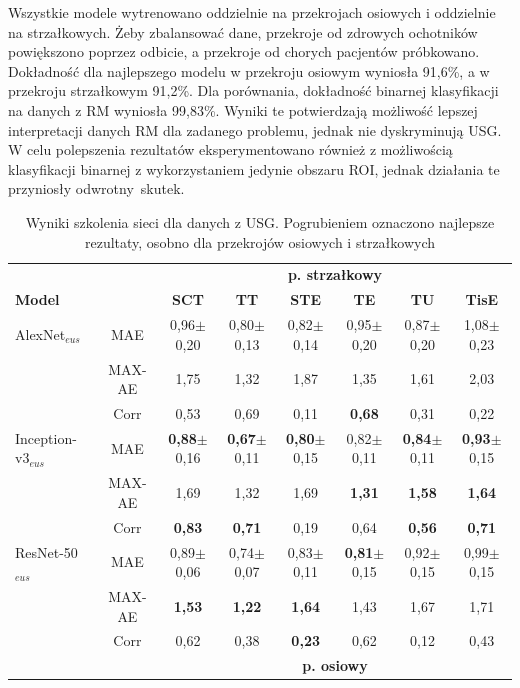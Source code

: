 Wszystkie modele wytrenowano oddzielnie na przekrojach osiowych i oddzielnie na strzałkowych. Żeby zbalansować dane, przekroje od zdrowych ochotników powiększono poprzez odbicie, a przekroje od chorych pacjentów próbkowano. Dokładność dla najlepszego modelu w przekroju osiowym wyniosła 91,6\%, a w przekroju strzałkowym 91,2\%. Dla porównania, dokładność binarnej klasyfikacji na danych z RM wyniosła 99,83\%. Wyniki te potwierdzają możliwość lepszej interpretacji danych RM dla zadanego problemu, jednak nie dyskryminują USG. W celu polepszenia rezultatów eksperymentowano również z możliwością klasyfikacji binarnej z wykorzystaniem jedynie obszaru ROI, jednak działania te przyniosły odwrotny~skutek.  
\vspace{6px}
\renewcommand{\arraystretch}{1.2}
\begin{table}[h]
	\scriptsize
	\setlength{\tabcolsep}{3pt}
	\centering
	\caption{Wyniki szkolenia sieci dla danych z USG. Pogrubieniem oznaczono najlepsze rezultaty, osobno dla przekrojów osiowych i strzałkowych}
	\label{tab:usg_train_cross-validation}
	\begin{tabular}{lc||c|c|c|c|c|c}
		& & \multicolumn{6}{c}{\textbf{p. strzałkowy}} \\
		\textbf{Model} & & \textbf{SCT} & \textbf{TT} & \textbf{STE} & \textbf{TE} & \textbf{TU} & \textbf{TisE} \\ \hline \hline
		AlexNet$_{eus}$ & MAE & 0,96$\pm$0,20 & 0,80$\pm$0,13 & 0,82$\pm$0,14 & 0,95$\pm$0,20 & 0,87$\pm$0,20 & 1,08$\pm$0,23  \\
		& MAX-AE & 1,75 & 1,32 & 1,87 & 1,35 & 1,61 & 2,03 \\ 
		& Corr & 0,53 & 0,69 & 0,11 & \textbf{0,68} & 0,31 & 0,22 \\ \hline
		Inception-v3$_{eus}$ & MAE & \textbf{0,88}$\pm$0,16 & \textbf{0,67}$\pm$0,11 & \textbf{0,80}$\pm$0,15 & 0,82$\pm$0,11 & \textbf{0,84}$\pm$0,11 & \textbf{0,93}$\pm$0,15  \\
		& MAX-AE & 1,69 & 1,32 & 1,69 & \textbf{1,31} & \textbf{1,58} & \textbf{1,64} \\ 
		& Corr & \textbf{0,83} & \textbf{0,71} & 0,19 & 0,64 & \textbf{0,56} & \textbf{0,71} \\ \hline
		ResNet-50$_{eus}$ & MAE & 0,89$\pm$0,06 & 0,74$\pm$0,07 & 0,83$\pm$0,11 & \textbf{0,81}$\pm$0,15 & 0,92$\pm$0,15 & 0,99$\pm$0,15 \\
		& MAX-AE & \textbf{1,53} & \textbf{1,22} & \textbf{1,64} & 1,43 & 1,67 & 1,71 \\
		& Corr & 0,62 & 0,38 & \textbf{0,23} & 0,62 & 0,12 & 0,43 \\ \hline \hline
		& & \multicolumn{6}{c}{\textbf{p. osiowy}} \\
		

\end{tabular}
\end{table}
